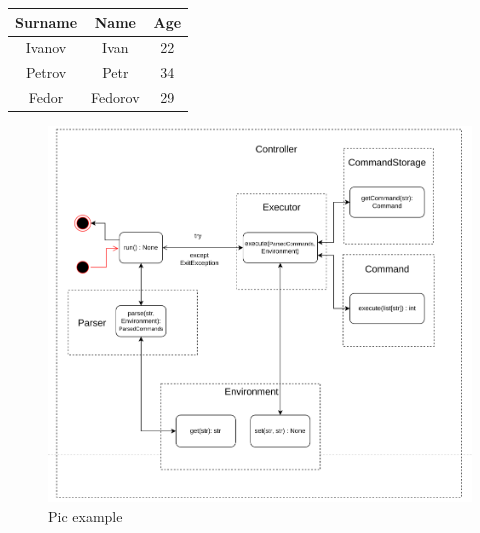 \documentclass{article}
\begin{document}
\begin{tabular}{|c|c|c|}
\hline
Surname & Name & Age\\ \hline
Ivanov & Ivan & 22\\ \hline
Petrov & Petr & 34\\ \hline
Fedor & Fedorov & 29 \\ \hline
\end{tabular}

\bigskip


\begin{figure}[h]
    \centering
    \includegraphics[width=0.8\linewidth]{pic.png}
    \caption{Pic example}
    \label{fig:example}
\end{figure}
\end{document}
